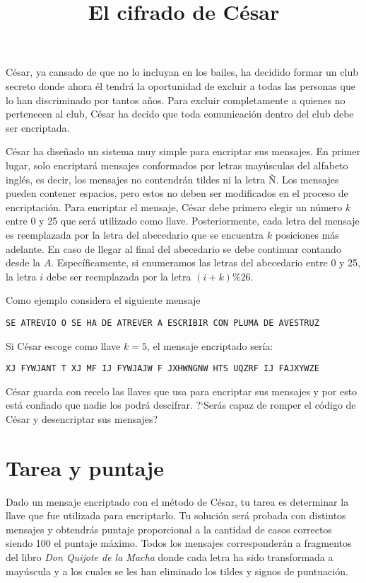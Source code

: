 \documentclass{oci}
\title{El cifrado de César}
\begin{document}
\begin{problemDescription}
César, ya cansado de que no lo incluyan en los bailes, ha decidido formar un club secreto
donde ahora él tendrá la oportunidad de excluir a todas las personas que lo han discriminado por
tantos años.
Para excluir completamente a quienes no pertenecen al club, César ha decido que toda comunicación
dentro del club debe ser encriptada.

César ha diseñado un sistema muy simple para encriptar sus mensajes.
En primer lugar, solo encriptará mensajes conformados por letras mayúsculas del alfabeto
inglés, es decir, los mensajes no contendrán tildes ni la letra Ñ.
Los mensajes pueden contener espacios, pero estos no deben ser modificados en el proceso de
encriptación.
Para encriptar el mensaje, César debe primero elegir un número $k$ entre 0 y 25 que será
utilizado como llave.
Posteriormente, cada letra del mensaje es reemplazada por la letra del abecedario que se
encuentra $k$ posiciones más adelante.
En caso de llegar al final del abecedario se debe continuar contando desde la $A$.
Específicamente, si enumeramos las letras del abecedario entre 0 y 25, la letra $i$ debe ser
reemplazada por la letra $(i+k)\% 26$.

Como ejemplo considera el siguiente mensaje
\begin{center}
  \texttt{SE ATREVIO O SE HA DE ATREVER A ESCRIBIR CON PLUMA DE AVESTRUZ}
\end{center}
Si César escoge como llave $k=5$, el mensaje encriptado sería:
\begin{center}
  \texttt{XJ FYWJANT T XJ MF IJ FYWJAJW F JXHWNGNW HTS UQZRF IJ FAJXYWZE}
\end{center}

César guarda con recelo las llaves que usa para encriptar sus mensajes y por esto
está confiado que nadie los podrá descifrar.
?`Serás capaz de romper el código de César y desencriptar sus mensajes?

\end{problemDescription}

\section*{Tarea y puntaje}
Dado un mensaje encriptado con el método de César, tu tarea es determinar la llave que fue
utilizada para encriptarlo.
Tu solución será probada con distintos mensajes y obtendrás puntaje proporcional a la cantidad
de casos correctos siendo 100 el puntaje máximo.
Todos los mensajes corresponderán a fragmentos del libro \emph{Don Quijote de la Macha} donde
cada letra ha sido transformada a mayúscula y a los cuales se les han eliminado los tildes
y signos de puntuación.
\end{document}
